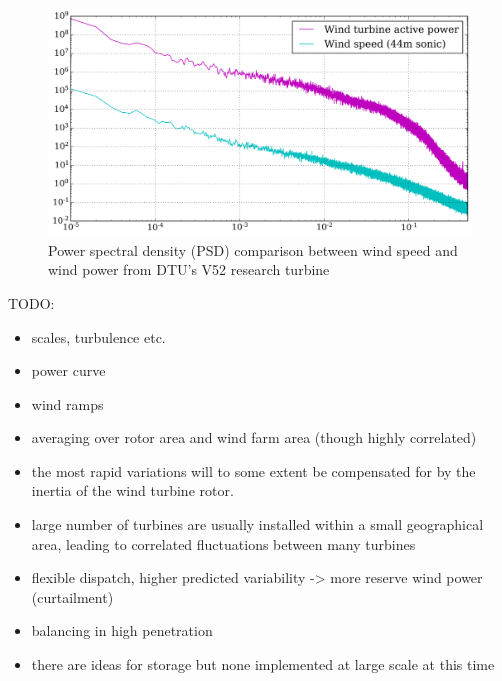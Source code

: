 \begin{figure}[htbp]
    \centering
        \includegraphics[width=1.0\textwidth]{graphics/intro/variability/wind_speed_power_psd.png}
    \caption{Power spectral density (PSD) comparison between wind speed and wind power from DTU's V52 research turbine}
    \label{fig:wind_speed_power_psd}
\end{figure}



TODO:
\begin{itemize}
\color{red}
    \item scales, turbulence etc.
    \item power curve
    \item wind ramps
    \item averaging over rotor area and wind farm area (though highly correlated)
    \item the most rapid variations will to some extent be compensated for by the inertia of the wind turbine rotor.
    \item large number of turbines are usually installed within a small geographical area, leading to correlated fluctuations between many turbines
    \item flexible dispatch, higher predicted variability -> more reserve wind power (curtailment)
    \item balancing in high penetration
    \item there are ideas for storage but none implemented at large scale at this time
\end{itemize}

